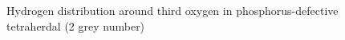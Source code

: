 \begin{figure}[h]
\begin{minipage}[h]{0.5\linewidth}
\end{minipage}
\hfill
\begin{minipage}[h]{0.5\linewidth}
\end{minipage}
\caption{Hydrogen distribution around third oxygen in phosphorus-defective tetraherdal (2 grey number)}
\label{HinO1,2and3}
\end{figure}

